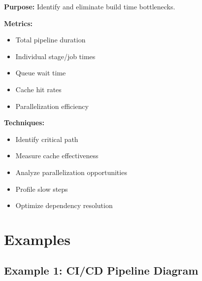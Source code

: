 \documentclass[11pt,letterpaper]{article}
\begin{document}
\begin{definitionbox}
\textbf{Purpose:} Identify and eliminate build time bottlenecks.

\textbf{Metrics:}
\begin{itemize}[nosep]
    \item Total pipeline duration
    \item Individual stage/job times
    \item Queue wait time
    \item Cache hit rates
    \item Parallelization efficiency
\end{itemize}

\textbf{Techniques:}
\begin{itemize}[nosep]
    \item Identify critical path
    \item Measure cache effectiveness
    \item Analyze parallelization opportunities
    \item Profile slow steps
    \item Optimize dependency resolution
\end{itemize}
\end{definitionbox}

\section{Examples}

\subsection{Example 1: CI/CD Pipeline Diagram}
\end{document}
